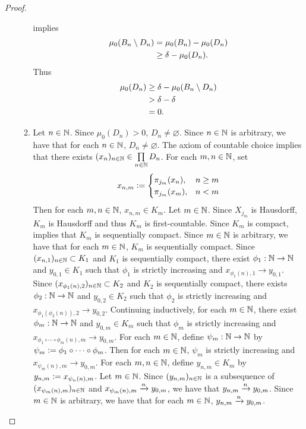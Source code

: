 \documentclass{book}
\begin{document}
\begin{proof}
\begin{enumerate}
\begin{enumerate}
			  implies
			\begin{align*}
				\mu_0(B_n \setminus D_n)
				& = \mu_0(B_n) - \mu_0(D_n) \\
				& \geq \delta - \mu_0(D_n). 
			\end{align*}
			Thus 
			\begin{align*}
				\mu_0(D_n)
				& \geq \delta - \mu_0(B_n \setminus D_n) \\
				& > \delta - \delta \\
				& = 0.
			\end{align*}
			\item Let $n \in \mathbb{N}$. Since $\mu_0(D_n) > 0$, $D_n \neq \varnothing$. Since $n \in \mathbb{N}$ is arbitrary, we have that for each $n \in \mathbb{N}$, $D_n \neq \varnothing$. The axiom of countable choice implies that there exists $(x_n)_{n \in \mathbb{N}} \in \prod\limits_{n \in \mathbb{N}} D_n$. For each $m,n \in \mathbb{N}$, set  
			\[
			x_{n,m} 
			\vcentcolon=
			\begin{cases}
				\pi_{j_m}(x_n), & n \geq m \\
				\pi_{j_m}(x_m), &  n < m
			\end{cases}
			\]
			Then for each $m,n \in \mathbb{N}$, $x_{n,m} \in K_m$. Let $m \in \mathbb{N}$. Since $X_{j_m}$ is Hausdorff, $K_m$ is Hausdorff and thus $K_m$ is first-countable. Since $K_m$ is compact,  implies that $K_m$ is sequentially compact. Since $m \in \mathbb{N}$ is arbitrary, we have that for each $m \in \mathbb{N}$, $K_m$ is sequentially compact. Since $(x_{n, 1})_{n \in \mathbb{N}} \subset K_1$ and $K_1$ is sequentially compact, there exist $\phi_1:\mathbb{N} \rightarrow \mathbb{N}$ and $y_{0,1} \in K_1$ such that $\phi_1$ is strictly increasing and $x_{\phi_1(n), 1} \rightarrow y_{0,1}$. Since $(x_{\phi_1(n), 2})_{n \in \mathbb{N}} \subset K_2$ and $K_2$ is sequentially compact, there exists $\phi_2:\mathbb{N} \rightarrow \mathbb{N}$ and $y_{0,2} \in K_2$ such that $\phi_2$ is strictly increasing and $x_{\phi_1( \phi_2(n)), 2} \rightarrow y_{0,2}$. Continuing inductively, for each $m \in \mathbb{N}$, there exist $\phi_m: \mathbb{N} \rightarrow \mathbb{N}$ and $y_{0,m} \in K_m$ such that $\phi_m$ is strictly increasing and $x_{\phi_1 \circ \cdots \circ \phi_m(n), m} \rightarrow y_{0, m}$. For each $m \in \mathbb{N}$, define $\psi_m: \mathbb{N} \rightarrow \mathbb{N}$ by $\psi_m \vcentcolon= \phi_1 \circ \cdots \circ \phi_m$. Then for each $m \in \mathbb{N}$, $\psi_m$ is strictly increasing and $x_{\psi_m(n), m} \rightarrow y_{0,m}$. For each $m,n \in \mathbb{N}$, define $y_{n,m} \in K_m$ by $y_{n,m} \vcentcolon= x_{\psi_n(n), m}$. Let $m \in \mathbb{N}$. Since $(y_{n,m})_{n \in \mathbb{N}}$ is a subsequence of $(x_{\psi_m(n), m})_{n \in \mathbb{N}}$ and $x_{\psi_m(n), m} \xrightarrow{n} y_{0,m}$, we have that $y_{n, m} \xrightarrow{n} y_{0, m}$. Since $m \in \mathbb{N}$ is arbitrary, we have that for each $m \in \mathbb{N}$, $y_{n,m} \xrightarrow{n} y_{0, m}$.

\end{enumerate}
\end{enumerate}
\end{proof}
\end{document}
